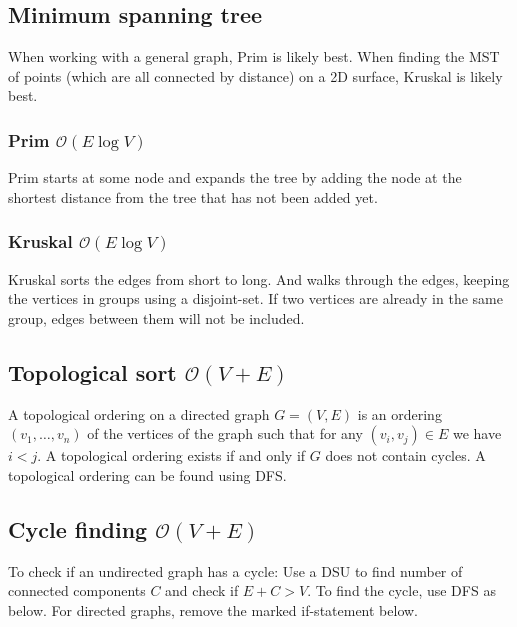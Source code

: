 \subsection{Minimum spanning tree}

When working with a general graph, Prim is likely best. When finding the MST of points (which are all connected by distance) on a 2D surface, Kruskal is likely best.

\subsubsection{Prim $\mathcal O(E\log V)$}
Prim starts at some node and expands the tree by adding the node at the shortest distance from the tree that has not been added yet.

\subsubsection{Kruskal $\mathcal O(E\log V)$}
Kruskal sorts the edges from short to long. And walks through the edges, keeping the vertices in groups using a disjoint-set. If two vertices are already in the same group, edges between them will not be included.



\subsection{Topological sort $\mathcal O(V + E)$}

A topological ordering on a directed graph $G = (V, E)$ is an ordering $(v_1, \dots, v_n)$ of the vertices of the graph such that for any $(v_i, v_j) \in E$ we have $i < j$. A topological ordering exists if and only if $G$ does not contain cycles. A topological ordering can be found using DFS.



\subsection{Cycle finding $\mathcal O(V + E)$}

To check if an undirected graph has a cycle: Use a DSU to find number of connected components $C$ and check if $E + C > V$. To find the cycle, use DFS as below. For directed graphs, remove the marked if-statement below.




